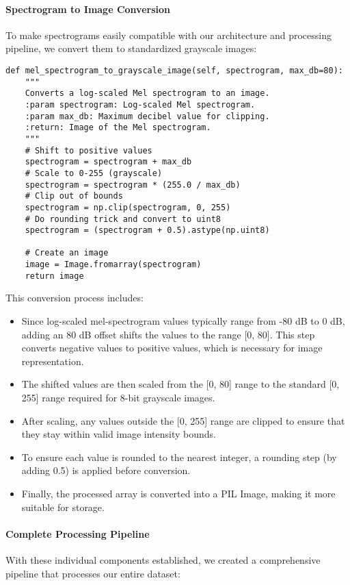\paragraph{Spectrogram to Image Conversion}
To make spectrograms easily compatible with our architecture and processing pipeline, we convert them to standardized grayscale images:

\begin{lstlisting}[caption=Converting spectrograms to grayscale images]
def mel_spectrogram_to_grayscale_image(self, spectrogram, max_db=80):
    """
    Converts a log-scaled Mel spectrogram to an image.
    :param spectrogram: Log-scaled Mel spectrogram.
    :param max_db: Maximum decibel value for clipping.
    :return: Image of the Mel spectrogram.
    """
    # Shift to positive values
    spectrogram = spectrogram + max_db
    # Scale to 0-255 (grayscale)
    spectrogram = spectrogram * (255.0 / max_db)
    # Clip out of bounds
    spectrogram = np.clip(spectrogram, 0, 255)
    # Do rounding trick and convert to uint8
    spectrogram = (spectrogram + 0.5).astype(np.uint8)
    
    # Create an image
    image = Image.fromarray(spectrogram)
    return image
\end{lstlisting}

This conversion process includes:
\begin{itemize}
    \item Since log-scaled  mel-spectrogram values typically range from -80 dB to 0 dB, adding an 80 dB offset shifts the values to the range [0, 80]. This step converts negative values to positive values, which is necessary for image representation.
    \item The shifted values are then scaled from the [0, 80] range to the standard [0, 255] range required for 8-bit grayscale images.
    \item After scaling, any values outside the [0, 255] range are clipped to ensure that they stay within valid image intensity bounds.
    \item To ensure each value is rounded to the nearest integer, a rounding step (by adding 0.5) is applied before conversion.
    \item Finally, the processed array is converted into a PIL Image, making it more suitable for storage.
\end{itemize}

\paragraph{Complete Processing Pipeline}
With these individual components established, we created a comprehensive pipeline that processes our entire dataset:

